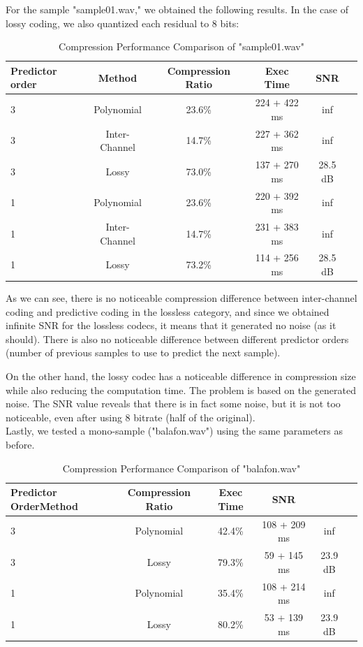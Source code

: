 \documentclass[a4paper,14pt]{article}
\begin{document}
For the sample "sample01.wav," we obtained the following results. In the case of lossy coding, we also quantized each residual to 8 bits:
\begin{table}[H]
\centering
\begin{tabular}{|l|c|c|c|c|c|}
\hline
\textbf{Predictor order} & \textbf{Method} & \textbf{Compression Ratio} & \textbf{Exec Time} & \textbf{SNR}\\
\hline
3 & Polynomial & 23.6\% & 224 + 422 ms & inf\\ 
3 &Inter-Channel & 14.7\% & 227 + 362 ms & inf\\
3 & Lossy & 73.0\% & 137 + 270 ms & 28.5 dB\\
\hline
1 & Polynomial & 23.6\% & 220 + 392 ms & inf\\
1 & Inter-Channel & 14.7\% & 231 + 383 ms & inf\\
1 & Lossy & 73.2\% & 114 + 256 ms & 28.5 dB\\
\hline
\end{tabular}
\caption{Compression Performance Comparison of "sample01.wav"}
\end{table}


As we can see, there is no noticeable compression difference between inter-channel coding and predictive coding in the lossless category, and since we obtained infinite SNR for the lossless codecs, it means that it generated no noise (as it should). There is also no noticeable difference between different predictor orders (number of previous samples to use to predict the next sample).

On the other hand, the lossy codec has a noticeable difference in compression size while also reducing the computation time. The problem is based on the generated noise. The SNR value reveals that there is in fact some noise, but it is not too noticeable, even after using 8 bitrate (half of the original). \\



Lastly, we tested a mono-sample ("balafon.wav") using the same parameters as before.
\begin{table}[H]
\centering
\begin{tabular}{|l|c|c|c|c|c|}
\hline
\textbf{Predictor Order}\textbf{Method} & \textbf{Compression Ratio} & \textbf{Exec Time} & \textbf{SNR}\\
\hline
3 & Polynomial & 42.4\% & 108 + 209 ms & inf\\ 
3 & Lossy & 79.3\% & 59 + 145 ms & 23.9 dB\\
\hline
1 & Polynomial & 35.4\% & 108 + 214 ms & inf\\ 
1 & Lossy & 80.2\% & 53 + 139 ms & 23.9 dB\\
\hline
\end{tabular}
\caption{Compression Performance Comparison of "balafon.wav"}
\end{table}
\end{document}
